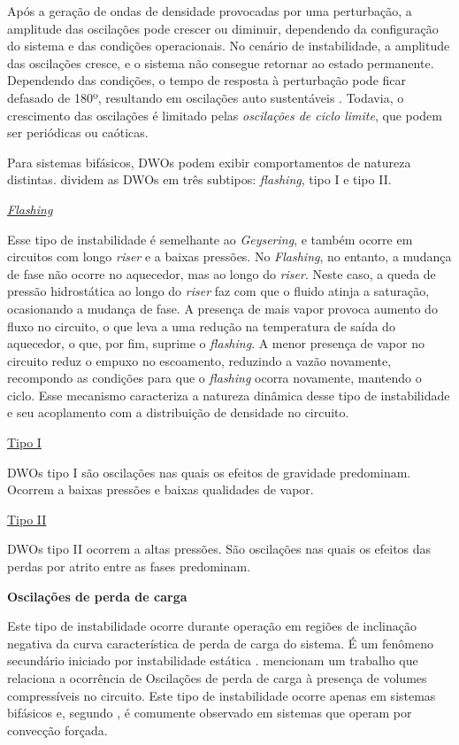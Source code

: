 \documentclass[a4paper,portuguese,10pt]{article}
\begin{document}
Após a geração de ondas de densidade provocadas por uma perturbação, a amplitude das oscilações pode crescer ou diminuir, dependendo da configuração do sistema e das condições operacionais. No cenário de instabilidade, a amplitude das oscilações cresce, e o sistema não consegue retornar ao estado permanente. Dependendo das condições, o tempo de resposta à perturbação pode ficar defasado de 180º, resultando em oscilações auto sustentáveis \cite{PRASAD07}. Todavia, o crescimento das oscilações é limitado pelas {\it oscilações de ciclo limite}, que podem ser periódicas ou caóticas.

Para sistemas bifásicos, DWOs podem exibir comportamentos de natureza distintas. \citet{PRASAD07} dividem as DWOs em três subtipos: {\it flashing}, tipo I e tipo II.

\underline{{\it Flashing}}

Esse tipo de instabilidade é semelhante ao {\it Geysering}, e também ocorre em circuitos com longo {\it riser} e a baixas pressões. No {\it Flashing}, no entanto, a mudança de fase não ocorre no aquecedor, mas ao longo do {\it riser}. Neste caso, a queda de pressão hidrostática ao longo do {\it riser} faz com que o fluido atinja a saturação, ocasionando a mudança de fase. A presença de mais vapor provoca aumento do fluxo no circuito, o que leva a uma redução na temperatura de saída do aquecedor, o que, por fim, suprime o {\it flashing}. A menor presença de vapor no circuito reduz o empuxo no escoamento, reduzindo a vazão novamente, recompondo as condições para que o {\it flashing} ocorra novamente, mantendo o ciclo. Esse mecanismo caracteriza a natureza dinâmica desse tipo de instabilidade e seu acoplamento com a distribuição de densidade no circuito.

\underline{Tipo I}

DWOs tipo I são oscilações nas quais os efeitos de gravidade predominam. Ocorrem a baixas pressões e baixas qualidades de vapor.

\underline{Tipo II}

DWOs tipo II ocorrem a altas pressões. São oscilações nas quais os efeitos das perdas por atrito entre as fases predominam.

\textbf{Oscilações de perda de carga}

Este tipo de instabilidade ocorre durante operação em regiões de inclinação negativa da curva característica de perda de carga do sistema. É um fenômeno secundário iniciado por instabilidade estática \cite{PRASAD07}. \citet{PRASAD07} mencionam um trabalho que relaciona a ocorrência de Oscilações de perda de carga à presença de volumes compressíveis no circuito. Este tipo de instabilidade ocorre apenas em sistemas bifásicos e, segundo \citet{VIJAYAN05b}, é comumente observado em sistemas que operam por convecção forçada.
\end{document}

